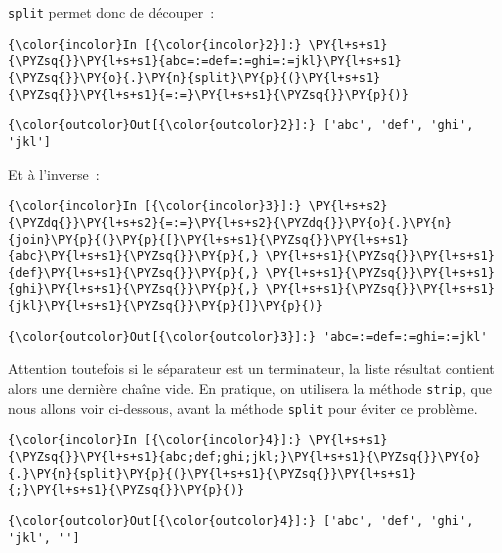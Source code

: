     \texttt{split} permet donc de découper~:

    \begin{Verbatim}[commandchars=\\\{\}]
{\color{incolor}In [{\color{incolor}2}]:} \PY{l+s+s1}{\PYZsq{}}\PY{l+s+s1}{abc=:=def=:=ghi=:=jkl}\PY{l+s+s1}{\PYZsq{}}\PY{o}{.}\PY{n}{split}\PY{p}{(}\PY{l+s+s1}{\PYZsq{}}\PY{l+s+s1}{=:=}\PY{l+s+s1}{\PYZsq{}}\PY{p}{)}
\end{Verbatim}


\begin{Verbatim}[commandchars=\\\{\}]
{\color{outcolor}Out[{\color{outcolor}2}]:} ['abc', 'def', 'ghi', 'jkl']
\end{Verbatim}
            
    Et à l'inverse~:

    \begin{Verbatim}[commandchars=\\\{\}]
{\color{incolor}In [{\color{incolor}3}]:} \PY{l+s+s2}{\PYZdq{}}\PY{l+s+s2}{=:=}\PY{l+s+s2}{\PYZdq{}}\PY{o}{.}\PY{n}{join}\PY{p}{(}\PY{p}{[}\PY{l+s+s1}{\PYZsq{}}\PY{l+s+s1}{abc}\PY{l+s+s1}{\PYZsq{}}\PY{p}{,} \PY{l+s+s1}{\PYZsq{}}\PY{l+s+s1}{def}\PY{l+s+s1}{\PYZsq{}}\PY{p}{,} \PY{l+s+s1}{\PYZsq{}}\PY{l+s+s1}{ghi}\PY{l+s+s1}{\PYZsq{}}\PY{p}{,} \PY{l+s+s1}{\PYZsq{}}\PY{l+s+s1}{jkl}\PY{l+s+s1}{\PYZsq{}}\PY{p}{]}\PY{p}{)}
\end{Verbatim}


\begin{Verbatim}[commandchars=\\\{\}]
{\color{outcolor}Out[{\color{outcolor}3}]:} 'abc=:=def=:=ghi=:=jkl'
\end{Verbatim}
            
    Attention toutefois si le séparateur est un terminateur, la liste
résultat contient alors une dernière chaîne vide. En pratique, on
utilisera la méthode \texttt{strip}, que nous allons voir ci-dessous,
avant la méthode \texttt{split} pour éviter ce problème.

    \begin{Verbatim}[commandchars=\\\{\}]
{\color{incolor}In [{\color{incolor}4}]:} \PY{l+s+s1}{\PYZsq{}}\PY{l+s+s1}{abc;def;ghi;jkl;}\PY{l+s+s1}{\PYZsq{}}\PY{o}{.}\PY{n}{split}\PY{p}{(}\PY{l+s+s1}{\PYZsq{}}\PY{l+s+s1}{;}\PY{l+s+s1}{\PYZsq{}}\PY{p}{)}
\end{Verbatim}


\begin{Verbatim}[commandchars=\\\{\}]
{\color{outcolor}Out[{\color{outcolor}4}]:} ['abc', 'def', 'ghi', 'jkl', '']
\end{Verbatim}
            
